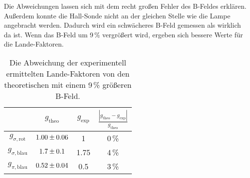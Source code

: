 Die Abweichungen lassen sich mit dem recht großen Fehler des B-Feldes erklären. Außerdem konnte die Hall-Sonde nicht an der gleichen Stelle wie die Lampe angebracht werden. Dadurch wird ein schwächeres B-Feld gemessen als wirklich da ist. Wenn das B-Feld um 9\,\% vergrößert wird, ergeben sich bessere Werte für die Lande-Faktoren.

\begin{table}[H]
   \centering
   \caption{Die Abweichung der experimentell ermittelten Lande-Faktoren von den theoretischen mit einem 9\,\% größeren B-Feld.}
   \label{tab:}
   \begin{tabular}{c|c|c|c}
     & $g_\text{theo}$ & $g_\text{exp}$ & $\frac{|g_\text{theo} - g_\text{exp}|}{g_\text{theo}}$ \\
     \hline
     $g_{\sigma,\text{rot}}$  & $\num{1.00 +- 0.06}$ & 1 & 0\,\% \\
     $g_{\sigma,\text{blau}}$ & $\num{1.7 +- 0.1}$   & 1.75 & 4\,\% \\
     $g_{\pi,\text{blau}}$    & $\num{0.52 +- 0.04}$ & 0.5 & 3\,\% \\
   \end{tabular}
\end{table}

